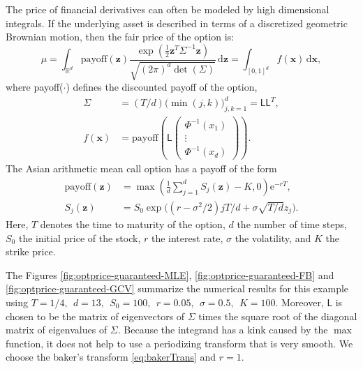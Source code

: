 \documentclass{iitthesis}          %
\newcommand{\bm}[1]{\boldsymbol{#1}}
\newcommand{\mSigma}{\mathsf{\Sigma}}
\newcommand{\dif}[1]{\text{d}{#1}}
\newcommand{\reals}{\mathbb{R}}
\newcommand{\vx}{\bm{x}}
\newcommand{\dvx}{\dif{\bm{x}}}
\newcommand{\vz}{\bm{z}}
\newcommand{\dvz}{\dif{\bm{z}}}
\newcommand{\mL}{\mathsf{L}}
\newcommand{\me}{\mathrm{e}}
\newcommand{\code}[1]{\texttt{#1}}
\begin{document}
{{{{{{

The price of financial derivatives can often be modeled by high dimensional integrals. If the underlying asset is described in terms of a discretized geometric Brownian motion, then the fair price of the option is:
\begin{equation*}
\mu = \int_{\reals^d} \text{payoff}(\vz) \frac{\exp(\frac 12 \vz^T\mSigma^{-1}\vz)}{\sqrt{(2\pi)^d \det(\mSigma)}} \, \dvz = \int_{[0,1]^d} f(\vx) \, \dvx,
\end{equation*} 
where {payoff($\cdot$)} defines the discounted payoff of the option,
\begin{align*}
\mSigma &= (T/d) \bigl(\min(j,k) \bigr)_{j,k=1}^d = \mL \mL^T,\\
f(\vx) &= \text{payoff} \left(\mL 
\begin{pmatrix}
\Phi^{-1}(x_1) \\ \vdots \\ \Phi^{-1}(x_d)
\end{pmatrix} \right).
\end{align*}
The Asian arithmetic mean call option has a payoff of the form
\begin{align*}
\text{payoff}(\vz) &= \max\left( \frac 1d  \sum_{j=1}^d S_j(\vz) - K, 0 \right) \me^{-r T}, \\
S_j(\vz) &= S_0 \exp\bigl((r-\sigma^2/2)jT/d + \sigma \sqrt{T/d} z_j \bigr).
\end{align*}
Here, $T$ denotes the time to maturity of the option, $d$ the number of time steps, $S_0$ the initial price of the stock, $r$ the interest rate, $\sigma$ the volatility, and $K$ the strike price.  

\Subsection{Using \code{cubBayesLattice\_g}}
The Figures \ref{fig:optprice-guaranteed-MLE}, \ref{fig:optprice-guaranteed-FB} and 
\ref{fig:optprice-guaranteed-GCV} summarize the numerical results for this example using
$
T = 1/4, \ \ d = 13, \ \ S_0 = 100, \ \ r =  0.05, \ \ \sigma = 0.5, \ \ K = 100.
$
Moreover, $\mL$ is chosen to be the matrix of eigenvectors of $\mSigma$ times the square root of the diagonal matrix of eigenvalues of $\mSigma$.
Because the integrand has a kink caused by the $\max$ function, it does not help to use a periodizing transform that is very smooth.  We choose the baker's transform \eqref{eq:bakerTrans} and $r = 1$.


}}}}}}
\end{document}
